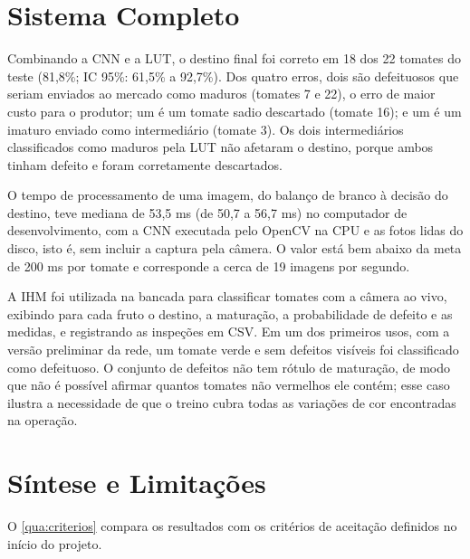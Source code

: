 \section{Sistema Completo}

Combinando a CNN e a LUT, o destino final foi correto em 18 dos 22 tomates do teste (81,8\%; IC 95\%: 61,5\% a 92,7\%). Dos quatro erros, dois são defeituosos que seriam enviados ao mercado como maduros (tomates 7 e 22), o erro de maior custo para o produtor; um é um tomate sadio descartado (tomate 16); e um é um imaturo enviado como intermediário (tomate 3). Os dois intermediários classificados como maduros pela LUT não afetaram o destino, porque ambos tinham defeito e foram corretamente descartados.

O tempo de processamento de uma imagem, do balanço de branco à decisão do destino, teve mediana de 53,5 ms (de 50,7 a 56,7 ms) no computador de desenvolvimento, com a CNN executada pelo OpenCV na CPU e as fotos lidas do disco, isto é, sem incluir a captura pela câmera. O valor está bem abaixo da meta de 200 ms por tomate e corresponde a cerca de 19 imagens por segundo.

A IHM foi utilizada na bancada para classificar tomates com a câmera ao vivo, exibindo para cada fruto o destino, a maturação, a probabilidade de defeito e as medidas, e registrando as inspeções em CSV. Em um dos primeiros usos, com a versão preliminar da rede, um tomate verde e sem defeitos visíveis foi classificado como defeituoso. O conjunto de defeitos não tem rótulo de maturação, de modo que não é possível afirmar quantos tomates não vermelhos ele contém; esse caso ilustra a necessidade de que o treino cubra todas as variações de cor encontradas na operação.

\section{Síntese e Limitações}

O \autoref{qua:criterios} compara os resultados com os critérios de aceitação definidos no início do projeto.

